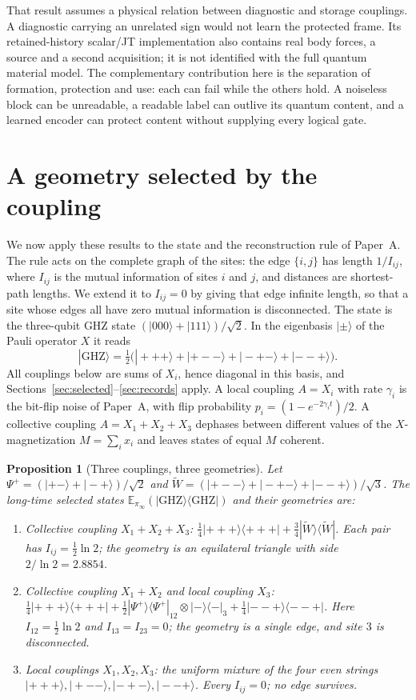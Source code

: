 \documentclass[12pt,a4paper]{article}
\newtheorem{proposition}[theorem]{Proposition}
\newcommand{\E}{\mathbb E}
\newcommand{\ket}[1]{|#1\rangle}
\newcommand{\proj}[1]{|#1\rangle\!\langle #1|}
\begin{document}
That result assumes a physical relation between diagnostic and storage
couplings. A diagnostic carrying an unrelated sign would not learn
the protected frame. Its retained-history scalar/JT implementation
also contains real body forces, a source and a second acquisition;
it is not identified with the full quantum material model.
The complementary contribution here is the separation of formation,
protection and use: each can fail while the others hold. A noiseless
block can be unreadable, a readable label can outlive its quantum
content, and a learned encoder can protect content without supplying
every logical gate.

\section{A geometry selected by the coupling}
\label{sec:ghz}

We now apply these results to the state and the reconstruction rule of Paper~A. The rule acts on the complete graph of the sites: the edge $\{i,j\}$ has length $1/I_{ij}$, where $I_{ij}$ is the mutual information of sites $i$ and $j$, and distances are shortest-path lengths. We extend it to $I_{ij}=0$ by giving that edge infinite length, so that a site whose edges all have zero mutual information is disconnected. The state is the three-qubit GHZ state $(\ket{000}+\ket{111})/\sqrt2$. In the eigenbasis $\ket\pm$ of the Pauli operator $X$ it reads
\[
\ket{\mathrm{GHZ}}=\tfrac12\bigl(\ket{+++}+\ket{+--}+\ket{-+-}+\ket{--+}\bigr).
\]
All couplings below are sums of $X_i$, hence diagonal in this basis, and Sections~\ref{sec:selected}--\ref{sec:records} apply. A local coupling $A=X_i$ with rate $\gamma_i$ is the bit-flip noise of Paper~A, with flip probability $p_i=(1-e^{-2\gamma_it})/2$. A collective coupling $A=X_1+X_2+X_3$ dephases between different values of the $X$-magnetization $M=\sum_ix_i$ and leaves states of equal $M$ coherent.

\begin{proposition}[Three couplings, three geometries]
\label{prop:three}
Let $\Psi^+=(\ket{+-}+\ket{-+})/\sqrt2$ and $\tilde W=(\ket{+--}+\ket{-+-}+\ket{--+})/\sqrt3$. The long-time selected states $\E_{\pi_\infty}(\proj{\mathrm{GHZ}})$ and their geometries are:
\begin{enumerate}
\item Collective coupling $X_1+X_2+X_3$: $\tfrac14\proj{+++}+\tfrac34\proj{\tilde W}$. Each pair has $I_{ij}=\tfrac12\ln2$; the geometry is an equilateral triangle with side $2/\ln2=2.8854$.
\item Collective coupling $X_1+X_2$ and local coupling $X_3$: $\tfrac14\proj{+++}+\tfrac12\proj{\Psi^+}_{12}\otimes\proj{-}_3+\tfrac14\proj{--+}$. Here $I_{12}=\tfrac12\ln2$ and $I_{13}=I_{23}=0$; the geometry is a single edge, and site $3$ is disconnected.
\item Local couplings $X_1,X_2,X_3$: the uniform mixture of the four even strings $\ket{+++},\ket{+--},\ket{-+-},\ket{--+}$. Every $I_{ij}=0$; no edge survives.
\end{enumerate}
\end{proposition}
\end{document}
